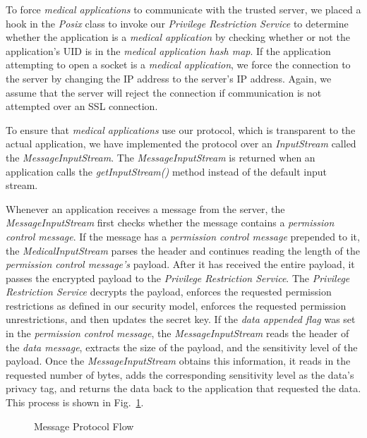 To force \textit{medical applications} to communicate with
the trusted server, we placed a hook in the \textit{Posix} class
to invoke our \textit{Privilege Restriction Service} to
determine whether the application is a \textit{medical application}
by checking whether or not the application's UID is in the
\textit{medical application hash map}.  If the application attempting
to open a socket is a \textit{medical application}, we force
the connection to the server by changing the IP address to the server's
IP address.  Again, we assume that the server will reject the connection
if communication is not attempted over an SSL connection.

To ensure that \textit{medical applications} use our protocol, which
is transparent to the actual application, we have implemented
the protocol over an \textit{InputStream} called the
\textit{MessageInputStream}.  The
\textit{MessageInputStream} is returned when an application calls 
the \textit{getInputStream()} method instead of the default input stream.

Whenever an application receives a message from the server, the
\textit{MessageInputStream} first checks whether the message
contains a \textit{permission control message}.  If the message has a
\textit{permission control message} prepended to it, the
\textit{MedicalInputStream} parses the header and continues
reading the length of the \textit{permission control message's} payload.
After it has received the entire payload, it passes the encrypted payload
to the \textit{Privilege Restriction Service}.  The
\textit{Privilege Restriction Service} decrypts the payload, enforces
the requested permission restrictions as defined in our security model,
enforces the requested permission unrestrictions, and then updates the secret key.
If the \textit{data appended flag} was set in the \textit{permission control message},
the \textit{MessageInputStream} reads the header of the \textit{data message},
extracts the size of the payload, and the sensitivity level of the payload.
Once the \textit{MessageInputStream} obtains this information, it reads in
the requested number of bytes, adds the corresponding sensitivity level
as the data's privacy tag, and returns the data back to the application
that requested the data.  This process is shown in Fig.~\ref{fig:frameworkcomponents}.

\begin{figure}[ht]
\centering
{}
\caption{Message Protocol Flow}
\label{fig:frameworkcomponents}
\end{figure}


